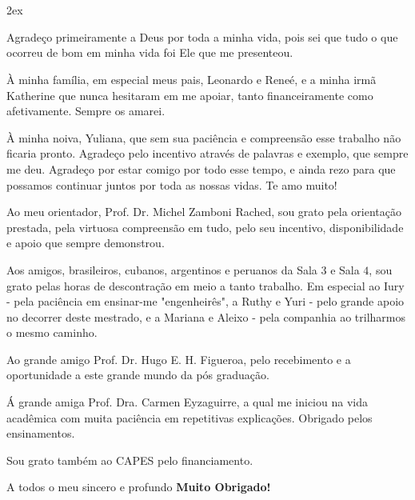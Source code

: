 
\chapter*{}


\begin{trivlist}  \itemsep 2ex  \normalsize

\item Agradeço primeiramente a Deus por toda a minha vida, pois sei que tudo o que ocorreu de bom em minha vida foi Ele que me presenteou.

\item À minha família, em especial meus pais, Leonardo e Reneé, e a minha irmã Katherine que nunca hesitaram em me apoiar, tanto financeiramente como afetivamente. Sempre os amarei.

\item À minha noiva, Yuliana, que sem sua paciência e compreensão esse trabalho não ficaria pronto. Agradeço pelo incentivo através de palavras e exemplo, que sempre me deu. Agradeço por estar comigo por todo esse tempo, e ainda rezo para que possamos continuar juntos por toda as nossas vidas. Te amo muito!

\item Ao meu orientador, Prof. Dr. Michel Zamboni Rached, sou grato pela orientação prestada, pela virtuosa compreensão em tudo, pelo seu incentivo, disponibilidade e apoio que sempre demonstrou.

\item Aos amigos, brasileiros, cubanos, argentinos e peruanos da Sala $3$ e Sala $4$, sou grato pelas horas de descontração em meio a tanto trabalho. Em especial ao Iury - pela paciência em ensinar-me "engenheirês", a Ruthy e Yuri - pelo grande apoio no decorrer deste mestrado, e a Mariana e Aleixo - pela companhia ao trilharmos o mesmo caminho.

\item Ao grande amigo Prof. Dr. Hugo E. H. Figueroa, pelo recebimento e a oportunidade a este grande mundo da pós graduação.

\item Á grande amiga Prof. Dra. Carmen Eyzaguirre, a qual me iniciou na vida acadêmica com muita paciência em repetitivas explicações. Obrigado pelos ensinamentos.

\item Sou grato também ao CAPES pelo financiamento.

\item A todos o meu sincero e profundo {\bf Muito Obrigado!}

\end{trivlist}



\newpage \thispagestyle{plain}

